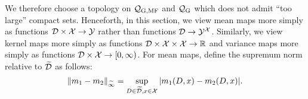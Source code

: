 \documentclass[12pt, twoside]{report}
\begin{document}
We therefore choose a topology on $\Qc\ss{G,MF}$ and $\Qc\ss{G}$ which does not admit ``too large'' compact sets.
Henceforth, in this section, we view mean maps more simply as functions $\mathcal{D} \times \mathcal{X} \to \mathcal{Y}$ rather than functions $\mathcal{D} \to \mathcal{Y}^{\mathcal{X}}$.
Similarly, we view kernel maps more simply as functions $\mathcal{D} \times \mathcal{X} \times \mathcal{X} \to \mathbb{R}$ and variance maps more simply as functions $\mathcal{D} \times \mathcal{X} \to [0, \infty)$.
%
For mean maps, define the supremum norm relative to $\widetilde{\mathcal{D}}$ as follows:%
\begin{equation}
    \lVert m_1 - m_2\rVert_{\widetilde\infty} = \operatorname*{sup}_{D \in \widetilde{\mathcal{D}}, x \in \mathcal{X}}\,\lvert m_{1}(D, x) - m_{2}(D, x)\rvert.
\end{equation}
\end{document}
